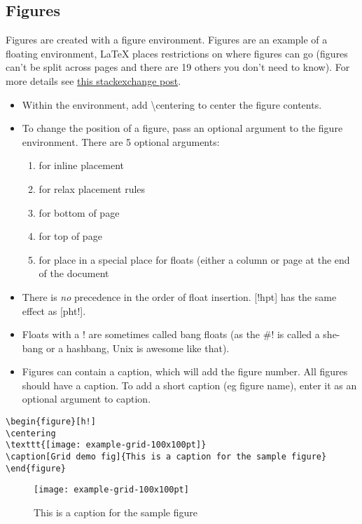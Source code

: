 \documentclass[11pt]{article}
\begin{document}
\subsection{Figures}
Figures are created with a figure environment.
Figures are an example of a floating environment, \LaTeX{} places restrictions on where figures can go (figures can't be split across pages and there are 19 others you don't need to know). For more details see \href{https://tex.stackexchange.com/questions/39017/how-to-influence-the-position-of-float-environments-like-figure-and-table-in-lat}{this stackexchange post}. 
\begin{itemize}
	\item Within the environment, add \textbackslash centering to center the figure contents.
	\item To change the position of a figure, pass an optional argument to the figure environment. There are 5 optional arguments:
	\begin{enumerate}
		\item[h] for inline placement
		\item[!] for relax placement rules
		\item[b] for bottom of page
		\item[t] for top of page
		\item[p] for place in a special place for floats (either a column or page at the end of the document
	\end{enumerate}
\item There is \emph{no} precedence in the order of float insertion. [!hpt] has the same effect as [pht!].
\item Floats with a ! are sometimes called bang floats (as the \#! is called a she-bang or a hashbang, Unix is awesome like that).
\item Figures can contain a caption, which will add the figure number. All figures should have a caption. To add a short caption (eg figure name), enter it as an optional argument to caption.
\end{itemize} 
\begin{verbatim}
\begin{figure}[h!]
\centering
\texttt{[image: example-grid-100x100pt]}
\caption[Grid demo fig]{This is a caption for the sample figure}
\end{figure}
\end{verbatim}
\begin{figure}[h!]
	\centering
	\texttt{[image: example-grid-100x100pt]}
	\caption[Grid demo fig]{This is a caption for the sample figure}
\end{figure}
\end{document}
